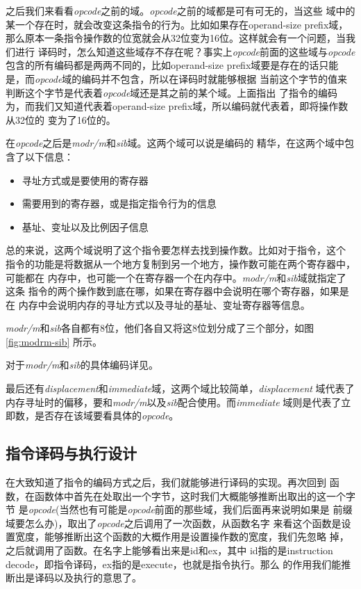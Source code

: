 之后我们来看看\emph{opcode}之前的域。\emph{opcode}之前的域都是可有可无的，当这些
域中的某一个存在时，就会改变这条指令的行为。比如如果存在operand-size prefix域，
那么原本一条指令操作数的位宽就会从32位变为16位。这样就会有一个问题，当我们进行
译码时，怎么知道这些域存不存在呢？事实上\emph{opcode}前面的这些域与\emph{opcode}
包含的所有编码都是两两不同的，比如operand-size prefix域要是存在的话只能
是，而\emph{opcode}域的编码并不包含，所以在译码时就能够根据
当前这个字节的值来判断这个字节是代表着\emph{opcode}域还是其之前的某个域。上面指出
了指令的编码为，而我们又知道代表着operand-size
prefix域，所以编码就代表着，即将操作数从32位的
变为了16位的。

在\emph{opcode}之后是\emph{modr/m}和\emph{sib}域。这两个域可以说是\arch 编码的
精华，在这两个域中包含了以下信息：
\begin{itemize}
  \item 寻址方式或是要使用的寄存器
  \item 需要用到的寄存器，或是指定指令行为的信息
  \item 基址、变址以及比例因子信息
\end{itemize}

总的来说，这两个域说明了这个指令要怎样去找到操作数。比如对于指令，这个
指令的功能是将数据从一个地方复制到另一个地方，操作数可能在两个寄存器中，可能都在
内存中，也可能一个在寄存器一个在内存中。\emph{modr/m}和\emph{sib}域就指定了这条
指令的两个操作数到底在哪，如果在寄存器中会说明在哪个寄存器，如果是在
内存中会说明内存的寻址方式以及寻址的基址、变址寄存器等信息。

\emph{modr/m}和\emph{sib}各自都有8位，他们各自又将这8位划分成了三个部分，如图\ref{fig:modrm-sib}
所示。


对于\emph{modr/m}和\emph{sib}的具体编码详见\cite{i386-manual}。

最后还有\emph{displacement}和\emph{immediate}域，这两个域比较简单，\emph{displacement}
域代表了内存寻址时的偏移，要和\emph{modr/m}以及\emph{sib}配合使用。而\emph{immediate}
域则是代表了立即数，是否存在该域要看具体的\emph{opcode}。

\subsection{\arch 指令译码与执行设计}
在大致知道了\arch 指令的编码方式之后，我们就能够进行译码的实现。再次回到
函数，在函数体中首先在\pc 处取出一个字节，这时我们大概能够推断出取出的这一个字节
是\emph{opcode}(当然也有可能是\emph{opcode}前面的那些域，我们后面再来说明如果是
前缀域要怎么办)，取出了\emph{opcode}之后调用了一次函数，从函数名字
来看这个函数是设置宽度，能够推断出这个函数的大概作用是设置操作数的宽度，我们先忽略
掉，之后就调用了函数。在名字上能够看出来是id和ex，其中
id指的是instruction decode，即指令译码，ex指的是execute，也就是指令执行。那么
的作用我们能推断出是译码以及执行的意思了。

